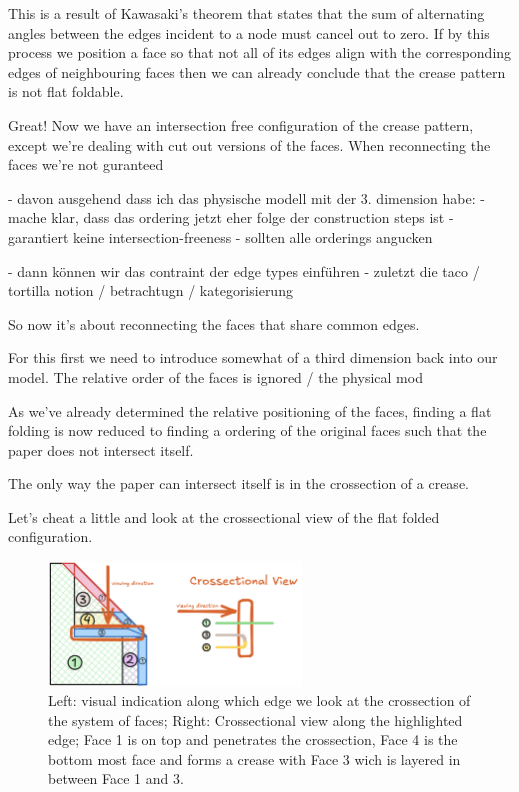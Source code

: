 This is a result of Kawasaki's theorem that states that the sum of alternating angles between the edges incident to a node must cancel out to zero. 
If by this process we position a face so that not all of its edges align with the corresponding edges of neighbouring faces
then we can already conclude that the crease pattern is not flat foldable.

Great! Now we have an intersection free configuration of the crease pattern, except we're dealing with cut out versions of the faces.
When reconnecting the faces we're not guranteed 

- davon ausgehend dass ich das physische modell mit der 3. dimension habe:
- mache klar, dass das ordering jetzt eher folge der construction steps ist
- garantiert keine intersection-freeness
- sollten alle orderings angucken

- dann können wir das contraint der edge types einführen
- zuletzt die taco / tortilla notion / betrachtugn / kategorisierung

So now it's about reconnecting the faces that share common edges.

For this first we need to introduce somewhat of a third dimension back into our model. The relative order of the faces is ignored / the physical mod

As we've already determined the relative positioning of the faces, finding a flat folding is now reduced
to finding a ordering of the original faces such that the paper does not intersect itself.

The only way the paper can intersect itself is in the crossection of a crease.

Let's cheat a little and look at the crossectional view of the flat folded configuration.

\begin{figure}[h]
\centering
\includegraphics[width=0.6\textwidth]{assets/demo_csx_taco_tortilla.png}
\caption{Left: visual indication along which edge we look at the crossection of the system of faces; Right: Crossectional view along the highlighted edge; Face 1 is on top and penetrates the crossection, Face 4 is the bottom most face and forms a crease with Face 3 wich is layered in between Face 1 and 3.}
\label{fig:demo_csx_taco_tortilla}
\end{figure}

